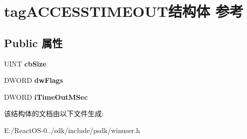 \hypertarget{structtag_a_c_c_e_s_s_t_i_m_e_o_u_t}{}\section{tag\+A\+C\+C\+E\+S\+S\+T\+I\+M\+E\+O\+U\+T结构体 参考}
\label{structtag_a_c_c_e_s_s_t_i_m_e_o_u_t}
\subsection*{Public 属性}
\begin{DoxyCompactItemize}
\item 
\mbox{\label{structtag_a_c_c_e_s_s_t_i_m_e_o_u_t_a80d7f8b0c28ddeaf16288061238e16bf}} 
U\+I\+NT {\bfseries cb\+Size}
\item 
\mbox{\label{structtag_a_c_c_e_s_s_t_i_m_e_o_u_t_aee6091d3653351b3bc30e80152a3e011}} 
D\+W\+O\+RD {\bfseries dw\+Flags}
\item 
\mbox{\label{structtag_a_c_c_e_s_s_t_i_m_e_o_u_t_aa9966d4bd11045a92b6aa93e44c1bc71}} 
D\+W\+O\+RD {\bfseries i\+Time\+Out\+M\+Sec}
\end{DoxyCompactItemize}


该结构体的文档由以下文件生成\+:\begin{DoxyCompactItemize}
\item 
E\+:/\+React\+O\+S-\/0../sdk/include/psdk/winuser.\+h\end{DoxyCompactItemize}
